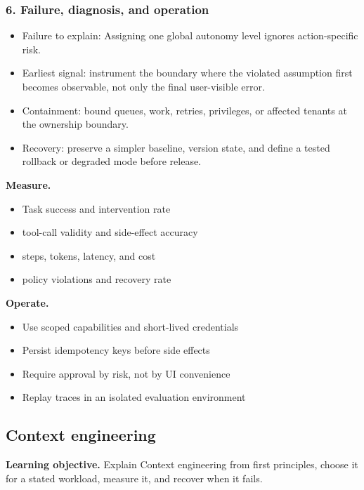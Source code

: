 \subsubsection*{6. Failure, diagnosis, and operation}
\begin{itemize}
\item Failure to explain: Assigning one global autonomy level ignores action-specific risk.
\item Earliest signal: instrument the boundary where the violated assumption first becomes observable, not only the final user-visible error.
\item Containment: bound queues, work, retries, privileges, or affected tenants at the ownership boundary.
\item Recovery: preserve a simpler baseline, version state, and define a tested rollback or degraded mode before release.
\end{itemize}
\textbf{Measure.}\begin{itemize}
\item Task success and intervention rate
\item tool-call validity and side-effect accuracy
\item steps, tokens, latency, and cost
\item policy violations and recovery rate
\end{itemize}
\textbf{Operate.}\begin{itemize}
\item Use scoped capabilities and short-lived credentials
\item Persist idempotency keys before side effects
\item Require approval by risk, not by UI convenience
\item Replay traces in an isolated evaluation environment
\end{itemize}
\subsection{Context engineering}
\textbf{Learning objective.} Explain Context engineering from first principles, choose it for a stated workload, measure it, and recover when it fails.
